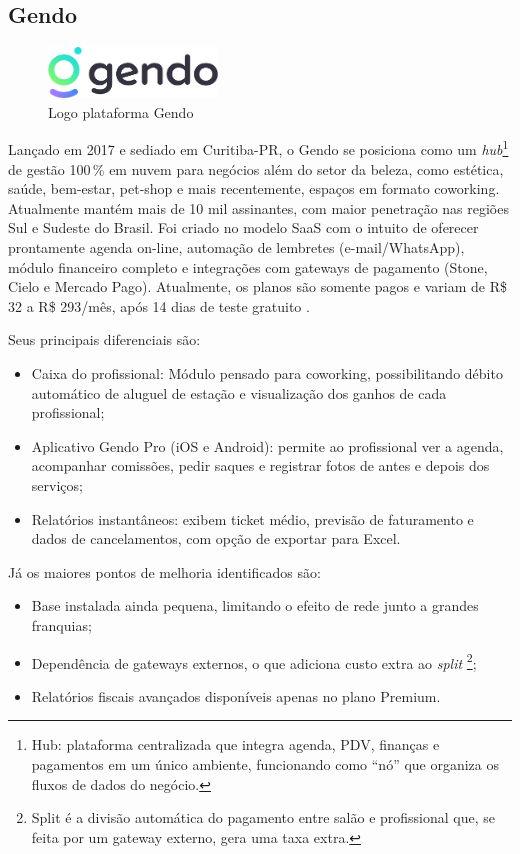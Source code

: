 \subsection{Gendo}

\begin{figure}[htb]
	\centering
	\includegraphics[width=0.4\textwidth]{cap01-Introducao/Images/1.4.2_Gendo}
	\caption{Logo plataforma Gendo}
	\label{fig:Gendo}
\end{figure}

Lançado em 2017 e sediado em Curitiba-PR, o Gendo se posiciona como um \emph{hub}\footnote{Hub: plataforma centralizada que integra agenda, PDV, finanças e pagamentos em um único ambiente, funcionando como “nó” que organiza os fluxos de dados do negócio.} de gestão 100\,\% em nuvem para negócios além do setor da beleza, como estética, saúde, bem-estar, pet-shop e mais recentemente, espaços em formato coworking. 
Atualmente mantém mais de 10 mil assinantes, com maior penetração nas regiões Sul e Sudeste do Brasil. Foi criado no modelo SaaS com o intuito de oferecer prontamente agenda on-line, automação de lembretes (e-mail/WhatsApp), módulo financeiro completo e integrações com gateways de pagamento (Stone, Cielo e Mercado Pago). Atualmente, os planos são somente pagos e variam de R\$ 32 a R\$ 293/mês, após 14 dias de teste gratuito \cite{Gendo}.

Seus principais diferenciais são:
\begin{itemize}
	\item Caixa do profissional: Módulo pensado para coworking, possibilitando débito automático de aluguel de estação e visualização dos ganhos de cada profissional;
	\item Aplicativo Gendo Pro (iOS e Android): permite ao profissional ver a agenda, acompanhar comissões, pedir saques e registrar fotos de antes e depois dos serviços;
	\item Relatórios instantâneos: exibem ticket médio, previsão de faturamento e dados de cancelamentos, com opção de exportar para Excel.
\end{itemize}


Já os maiores pontos de melhoria identificados são:
\begin{itemize}
	\item Base instalada ainda pequena, limitando o efeito de rede junto a grandes franquias;
	\item Dependência de gateways externos, o que adiciona custo extra ao \emph{split} \footnote{Split é a divisão automática do pagamento entre salão e profissional que, se feita por um gateway externo, gera uma taxa extra.};
	\item Relatórios fiscais avançados disponíveis apenas no plano Premium.
\end{itemize}

